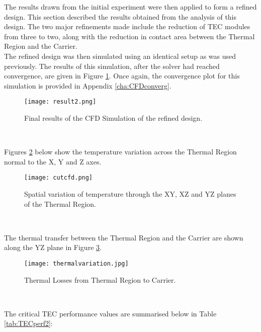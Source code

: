 The results drawn from the initial experiment were then applied to form a refined design. This section described the results obtained from the analysis of this design. The two major refinements made include the reduction of TEC modules from three to two, along with the reduction in contact area between the Thermal Region and the Carrier.\\

The refined design was then simulated using an identical setup as was used previously. The results of this simulation, after the solver had reached convergence, are given in Figure \ref{fig:result2}. Once again, the convergence plot for this simulation is provided in Appendix \ref{cha:CFDconverg}.

\begin{figure}[!htb]
	\centering
	\texttt{[image: result2.png]}
	\caption[CFD Results - Refined Design.]{Final results of the CFD Simulation of the refined design.}
	\label{fig:result2}
\end{figure} 
\FloatBarrier

Figures \ref{fig:cutcfd} below show the temperature variation across the Thermal Region normal to the X, Y and Z axes.

\begin{figure}[!htb]
	\centering
	\texttt{[image: cutcfd.png]}
	\caption[CFD Results - Spatial Variations of Temperation.]{Spatial variation of temperature through the XY, XZ and YZ planes of the Thermal Region.}
	\label{fig:cutcfd}
\end{figure} 
\FloatBarrier

The thermal transfer between the Thermal Region and the Carrier are shown along the YZ plane in Figure \ref{fig:thermalvariation}.

\begin{figure}[!htb]
	\centering
	\texttt{[image: thermalvariation.jpg]}
	\caption[CFD Results - Thermal Losses from Thermal Region to Carrier.]{Thermal Losses from Thermal Region to Carrier.}
	\label{fig:thermalvariation}
\end{figure} 
\FloatBarrier

The critical TEC performance values are summarised below in Table \ref{tab:TECperf2}:

